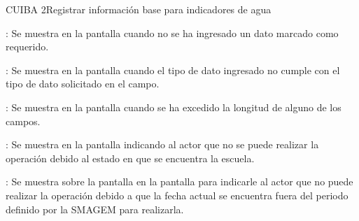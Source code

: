 \begin{UseCase}{CUIBA 2}{Registrar información base para indicadores de agua}
{\begin{UClist}
	    \UCli {}: Se muestra en la pantalla  cuando no se ha ingresado un dato marcado como requerido.
	    
	    \UCli {}: Se muestra en la pantalla  cuando el tipo de dato ingresado no cumple con el tipo de dato solicitado en el campo.
	    
	    \UCli {}: Se muestra en la pantalla  cuando se ha excedido la longitud de alguno de los campos.	    
	    
	    \UCli {}: Se muestra en la pantalla  indicando al actor que no se puede realizar la operación debido al estado en que se encuentra la escuela.
	    
	    \UCli {}: Se muestra sobre la pantalla en la pantalla  para indicarle al actor que no puede realizar la operación debido a que la fecha actual se encuentra fuera del periodo definido por la SMAGEM para realizarla.
	\end{UClist}
    }


\end{UseCase}

